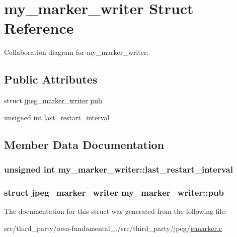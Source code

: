 \hypertarget{structmy__marker__writer}{}\section{my\+\_\+marker\+\_\+writer Struct Reference}
\label{structmy__marker__writer}


Collaboration diagram for my\+\_\+marker\+\_\+writer\+:
\subsection*{Public Attributes}
\begin{DoxyCompactItemize}
\item 
struct \hyperlink{structjpeg__marker__writer}{jpeg\+\_\+marker\+\_\+writer} \hyperlink{structmy__marker__writer_a4b02f71e32586520f4498e51a79b1fca}{pub}
\item 
unsigned int \hyperlink{structmy__marker__writer_a772bc536da8c387a460a529c3d8145e4}{last\+\_\+restart\+\_\+interval}
\end{DoxyCompactItemize}


\subsection{Member Data Documentation}
\hypertarget{structmy__marker__writer_a772bc536da8c387a460a529c3d8145e4}{}
\subsubsection[{last\+\_\+restart\+\_\+interval}]{\setlength{\rightskip}{0pt plus 5cm}unsigned int my\+\_\+marker\+\_\+writer\+::last\+\_\+restart\+\_\+interval}\label{structmy__marker__writer_a772bc536da8c387a460a529c3d8145e4}
\hypertarget{structmy__marker__writer_a4b02f71e32586520f4498e51a79b1fca}{}
\subsubsection[{pub}]{\setlength{\rightskip}{0pt plus 5cm}struct {\bf jpeg\+\_\+marker\+\_\+writer} my\+\_\+marker\+\_\+writer\+::pub}\label{structmy__marker__writer_a4b02f71e32586520f4498e51a79b1fca}


The documentation for this struct was generated from the following file\+:\begin{DoxyCompactItemize}
\item 
src/third\+\_\+party/orsa-\/fundamental\+\_./src/third\+\_\+party/jpeg/\hyperlink{jcmarker_8c}{jcmarker.\+c}\end{DoxyCompactItemize}
